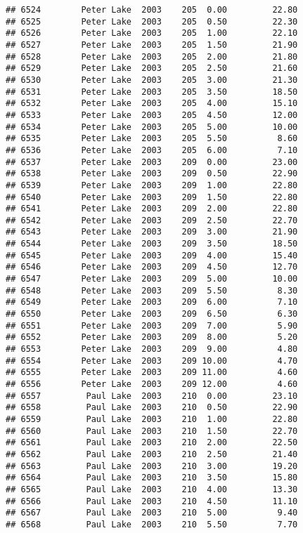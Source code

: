 \documentclass[
]{article}
\begin{document}
\begin{verbatim}
## 6524        Peter Lake  2003    205  0.00         22.80
## 6525        Peter Lake  2003    205  0.50         22.30
## 6526        Peter Lake  2003    205  1.00         22.10
## 6527        Peter Lake  2003    205  1.50         21.90
## 6528        Peter Lake  2003    205  2.00         21.80
## 6529        Peter Lake  2003    205  2.50         21.60
## 6530        Peter Lake  2003    205  3.00         21.30
## 6531        Peter Lake  2003    205  3.50         18.50
## 6532        Peter Lake  2003    205  4.00         15.10
## 6533        Peter Lake  2003    205  4.50         12.00
## 6534        Peter Lake  2003    205  5.00         10.00
## 6535        Peter Lake  2003    205  5.50          8.60
## 6536        Peter Lake  2003    205  6.00          7.10
## 6537        Peter Lake  2003    209  0.00         23.00
## 6538        Peter Lake  2003    209  0.50         22.90
## 6539        Peter Lake  2003    209  1.00         22.80
## 6540        Peter Lake  2003    209  1.50         22.80
## 6541        Peter Lake  2003    209  2.00         22.80
## 6542        Peter Lake  2003    209  2.50         22.70
## 6543        Peter Lake  2003    209  3.00         21.90
## 6544        Peter Lake  2003    209  3.50         18.50
## 6545        Peter Lake  2003    209  4.00         15.40
## 6546        Peter Lake  2003    209  4.50         12.70
## 6547        Peter Lake  2003    209  5.00         10.00
## 6548        Peter Lake  2003    209  5.50          8.30
## 6549        Peter Lake  2003    209  6.00          7.10
## 6550        Peter Lake  2003    209  6.50          6.30
## 6551        Peter Lake  2003    209  7.00          5.90
## 6552        Peter Lake  2003    209  8.00          5.20
## 6553        Peter Lake  2003    209  9.00          4.80
## 6554        Peter Lake  2003    209 10.00          4.70
## 6555        Peter Lake  2003    209 11.00          4.60
## 6556        Peter Lake  2003    209 12.00          4.60
## 6557         Paul Lake  2003    210  0.00         23.10
## 6558         Paul Lake  2003    210  0.50         22.90
## 6559         Paul Lake  2003    210  1.00         22.80
## 6560         Paul Lake  2003    210  1.50         22.70
## 6561         Paul Lake  2003    210  2.00         22.50
## 6562         Paul Lake  2003    210  2.50         21.40
## 6563         Paul Lake  2003    210  3.00         19.20
## 6564         Paul Lake  2003    210  3.50         15.80
## 6565         Paul Lake  2003    210  4.00         13.30
## 6566         Paul Lake  2003    210  4.50         11.10
## 6567         Paul Lake  2003    210  5.00          9.40
## 6568         Paul Lake  2003    210  5.50          7.70

\end{verbatim}
\end{document}
